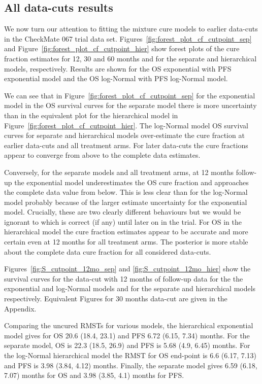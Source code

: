 \documentclass[AMA,STIX1COL]{WileyNJD-v2}
\begin{document}
%
\subsection{All data-cuts results}\label{sec:results-data-cut}
We now turn our attention to fitting the mixture cure models to earlier data-cuts in the CheckMate 067 trial data set. 
Figures~\ref{fig:forest_plot_cf_cutpoint_sep} and Figure~\ref{fig:forest_plot_cf_cutpoint_hier} show forest plots of the cure fraction estimates for 12, 30 and 60 months and for the separate and hierarchical models, respectively.
Results are shown for the OS exponential with PFS exponential model and the OS log-Normal with PFS log-Normal model.

We can see that in Figure~\ref{fig:forest_plot_cf_cutpoint_sep} for the exponential model in the OS survival curves for the separate model there is more uncertainty than in the equivalent plot for the hierarchical model in Figure~\ref{fig:forest_plot_cf_cutpoint_hier}.
The log-Normal model OS survival curves for separate and hierarchical models over-estimate the cure fraction at earlier data-cuts and all treatment arms.
For later data-cuts the cure fractions appear to converge from above to the complete data estimates.

Conversely, for the separate models and all treatment arms, at 12 months follow-up the exponential model underestimates the OS cure fraction and approaches the complete data value from below.
This is less clear than for the log-Normal model probably because of the larger estimate uncertainty for the exponential model.
Crucially, these are two clearly different behaviours but we would be ignorant to which is correct (if any) until later on in the trial.
For OS in the hierarchical model the cure fraction estimates appear to be accurate and more certain even at 12 months for all treatment arms.
The posterior is more stable about the complete data cure fraction for all considered data-cuts.


Figures~\ref{fig:S_cutpoint_12mo_sep} and \ref{fig:S_cutpoint_12mo_hier} show the survival curves for the data-cut with 12 months of follow-up data for the the exponential and log-Normal models and for the separate and hierarchical models respectively.
Equivalent Figures for 30 months data-cut are given in the Appendix.

Comparing the uncured RMSTs for various models,
the hierarchical exponential model gives for OS 20.6 (18.4, 23.1) and PFS 6.72 (6.15, 7.34) months.
For the separate model, OS is 22.3 (18.5, 26.9) and PFS is 5.68 (4.9, 6.45) months.
For the log-Normal hierarchical model the RMST for OS end-point is 6.6 (6.17, 7.13) and PFS is 3.98 (3.84, 4.12) months.
Finally, the separate model gives 6.59 (6.18, 7.07) months for OS and 3.98 (3.85, 4.1) months for PFS.
\end{document}
